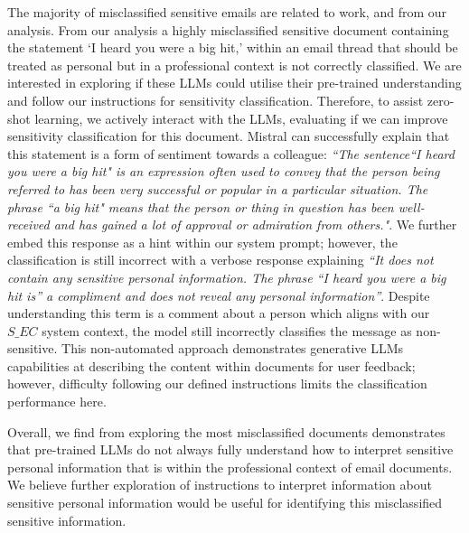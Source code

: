 The majority of misclassified sensitive emails are related to work, and from our analysis. From our analysis a highly misclassified sensitive document containing the statement ‘I heard you were a big hit,’ within an email thread that should be treated as personal but in a professional context is not correctly classified. We are interested in exploring if these LLMs could utilise their pre-trained understanding and follow our instructions for sensitivity classification. Therefore, to assist zero-shot learning, we actively interact with the LLMs, evaluating if we can improve sensitivity classification for this document. Mistral can successfully explain that this statement is a form of sentiment towards a colleague: \textit{``The sentence``I heard you were a big hit" is an expression often used to convey that the person being referred to has been very successful or popular in a particular situation. The phrase ``a big hit" means that the person or thing in question has been well-received and has gained a lot of approval or admiration from others."}. We further embed this response as a hint within our system prompt; however, the classification is still incorrect with a verbose response explaining \textit{“It does not contain any sensitive personal information. The phrase ``I heard you were a big hit is” a compliment and does not reveal any personal information”}. Despite understanding this term is a comment about a person which aligns with our $S\_EC$ system context, the model still incorrectly classifies the message as non-sensitive. This non-automated approach demonstrates generative LLMs capabilities at describing the content within documents for user feedback; however, difficulty following our defined instructions limits the classification performance here.

Overall, we find from exploring the most misclassified documents demonstrates that pre-trained LLMs do not always fully understand how to interpret sensitive personal information that is within the professional context of email documents. We believe further exploration of instructions to interpret information about sensitive personal information would be useful for identifying this misclassified sensitive information.

